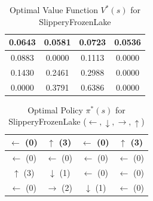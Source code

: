 \documentclass{article}
\begin{document}
\begin{enumerate}
\begin{table}[htbp]
\centering
\caption{Optimal Value Function $V^*(s)$ for SlipperyFrozenLake}
\begin{tabular}{|c|c|c|c|}
\hline
0.0643 & 0.0581 & 0.0723 & 0.0536 \\ \hline
0.0883 & 0.0000 & 0.1113 & 0.0000 \\ \hline
0.1430 & 0.2461 & 0.2988 & 0.0000 \\ \hline
0.0000 & 0.3791 & 0.6386 & 0.0000 \\ \hline
\end{tabular}
\end{table}

\begin{table}[htbp]
\centering
\caption{Optimal Policy $\pi^*(s)$ for SlipperyFrozenLake ($\leftarrow, \downarrow, \rightarrow, \uparrow$)}
\begin{tabular}{|c|c|c|c|}
\hline
$\leftarrow$ (0) & $\uparrow$ (3) & $\leftarrow$ (0) & $\uparrow$ (3) \\ \hline
$\leftarrow$ (0) & $\leftarrow$ (0) & $\leftarrow$ (0) & $\leftarrow$ (0) \\ \hline
$\uparrow$ (3) & $\downarrow$ (1) & $\leftarrow$ (0) & $\leftarrow$ (0) \\ \hline
$\leftarrow$ (0) & $\rightarrow$ (2) & $\downarrow$ (1) & $\leftarrow$ (0) \\ \hline
\end{tabular}
\end{table}














    
\end{enumerate}
\end{document}

